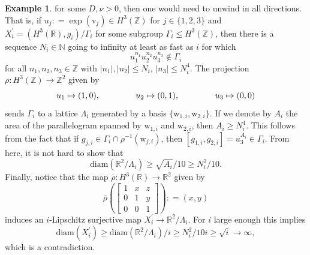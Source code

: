 \documentclass[12pt]{amsart}
\theoremstyle{definition}
\def\fnum{equation}
\newtheorem{example}[\fnum]{Example}
\numberwithin{equation}{section}
\newcommand{\diam}{{\text {diam}}}
\newcommand{\vv}{\text{v}}
\newcommand{\ww}{\text{w}}
\newcommand{\R}{\mathbb{R}}
\newcommand{\Z}{\mathbb{Z}}
\begin{document}
\begin{example}
for some $D, \nu > 0 $, then one would need to unwind in all directions. That is, if $u_j : =  \exp (\vv_j) \in H^3(\Z )$ for $j \in \{ 1, 2, 3 \} $ and $X_i^{\prime} = ( H^3 (\R) , g_i ) / \Gamma_i$ for some subgroup $\Gamma_i \leq H^3(\Z )$, then there is a sequence $N_i \in \mathbb{N}$ going to infinity at least as fast as $i$ for which 
\[   u_1 ^{n_1} u_2 ^{n_2}u_3^{n_3}  \notin \Gamma _ i  \]
for all $n_1, n_2, n_3 \in \Z $ with $\vert n_1 \vert , \vert n_2 \vert  \leq N_i $, $ \vert n_3 \vert  \leq N_i ^ 4$. The projection  $\rho : H^3 (\Z ) \to  \Z^2$ given by
\[        u_1 \mapsto (1,0) ,  \hspace{1.5cm} u_2 \mapsto (0,1) , \hspace{1.5cm} u_3 \mapsto (0,0)           \]
sends $\Gamma _ i $ to a lattice $\Lambda_i $ generated by a basis $\{  \ww _{1,i} ,  \ww_{2,i} \}$. If we denote by $A_i$ the area of the parallelogram spanned by $ \ww _{1,i} $ and $\ww _{2,i}$, then  $A_i \geq N_i^4$. This follows from the fact that if $g_{j,i} \in \Gamma _i \cap \rho ^{-1} (\ww _{j,i})$, then $[ g_{1,i}, g_{2,i}] = u_3 ^{A_i} \in \Gamma _ i $. From here, it is not hard to show that  
\[ \diam ( \mathbb{R}^2 / \Lambda _i ) \geq  \sqrt{A_i } / 10 \geq N_i ^2 / 10  . \]  
Finally, notice that the map $\overline {\rho } : H^3 (\R ) \to \mathbb{R}^2$ given by 
\[    \overline{\rho} \left(    \begin{bmatrix}
    1 & x & z\\
    0 & 1 & y\\
    0 & 0 & 1
\end{bmatrix}   \right) : = (x,y)                          \]
induces an $i$-Lipschitz surjective map $X_i ^{\prime} \to \mathbb{R}^2 / \Lambda _i$. For $i$ large enough this implies
\[     \diam (X_i^{\prime})  \geq \diam (\mathbb{R} ^2 / \Lambda _i) / i   \geq  N_i ^2 / 10 i  \geq \sqrt{i}  \to \infty ,  \]
which is a contradiction.
\end{example}
\end{document}
